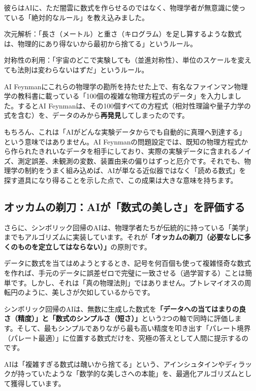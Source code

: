 彼らはAIに、ただ闇雲に数式を作らせるのではなく、物理学者が無意識に使っている「絶対的なルール」を教え込みました。

次元解析：「長さ（メートル）と重さ（キログラム）を足し算するような数式は、物理的にあり得ないから最初から捨てる」というルール。

対称性の利用：「宇宙のどこで実験しても（並進対称性）、単位のスケールを変えても法則は変わらないはずだ」というルール。

AI Feynmanにこれらの物理学の勘所を持たせた上で、有名なファインマン物理学の教科書に載っている「100個の複雑な物理方程式のデータ」を入力しました。するとAI Feynmanは、その100個すべての方程式（相対性理論や量子力学の式を含む）を、データのみから\textbf{再発見}してしまったのです。

もちろん、これは「AIがどんな実験データからでも自動的に真理へ到達する」という意味ではありません。AI Feynmanの問題設定では、既知の物理方程式から作られたきれいなデータを相手にしており、実際の実験データに含まれるノイズ、測定誤差、未観測の変数、装置由来の偏りはずっと厄介です。それでも、物理学の制約をうまく組み込めば、AIが単なる近似器ではなく「読める数式」を探す道具になり得ることを示した点で、この成果は大きな意味を持ちます。

\subsection{オッカムの剃刀：AIが「数式の美しさ」を評価する}

さらに、シンボリック回帰のAIは、物理学者たちが伝統的に持っている「美学」までもアルゴリズムに実装しています。それが\textbf{「オッカムの剃刀（必要なしに多くのものを定立してはならない）」}の原則です。

データに数式を当てはめようとするとき、記号を何百個も使って複雑怪奇な数式を作れば、手元のデータに誤差ゼロで完璧に一致させる（過学習する）ことは簡単です。しかし、それは「真の物理法則」ではありません。プトレマイオスの周転円のように、美しさが欠如しているからです。

シンボリック回帰のAIは、無数に生成した数式を\textbf{「データへの当てはまりの良さ（精度）」と「数式のシンプルさ（短さ）」}という2つの軸で同時に評価します。そして、最もシンプルでありながら最も高い精度を叩き出す「パレート境界（パレート最適）」に位置する数式だけを、究極の答えとして人間に提示するのです。

AIは「複雑すぎる数式は醜いから捨てる」という、アインシュタインやディラックが持っていたような「数学的な美しさへの本能」を、最適化アルゴリズムとして獲得しています。

